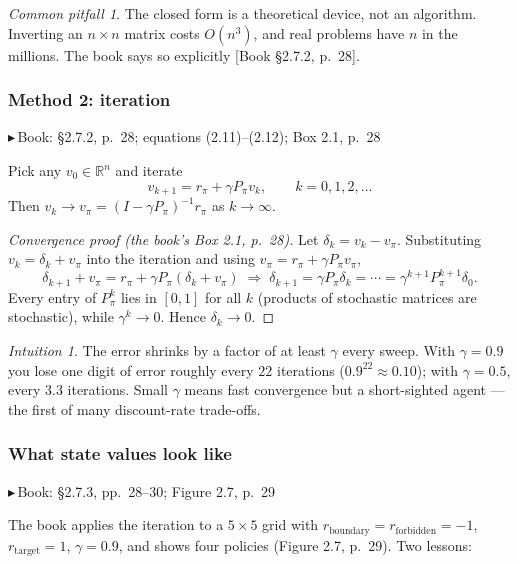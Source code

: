 \documentclass[11pt, letterpaper]{article}
\theoremstyle{runin}
\theoremstyle{runinplain}
\theoremstyle{remark}
\newtheorem*{warning}{Common pitfall}
\newtheorem*{intuition}{Intuition}
\newcommand{\R}{\mathbb{R}}
\newcommand{\bk}[1]{{\color{bookblue}\small$\blacktriangleright$\,\textsf{Book: #1}}}
\newcommand{\bkin}[1]{{\color{bookblue}\small[\textsf{Book #1}]}}
\begin{document}
\begin{warning}
The closed form is a theoretical device, not an algorithm. Inverting an
$n\times n$ matrix costs $O(n^3)$, and real problems have $n$ in the millions.
The book says so explicitly \bkin{\S2.7.2, p.~28}.
\end{warning}

\subsubsection{Method 2: iteration}

\bk{\S2.7.2, p.~28; equations (2.11)--(2.12); Box 2.1, p.~28}

Pick any $v_0\in\R^n$ and iterate
\[
  v_{k+1}=r_\pi+\gamma P_\pi v_k,\qquad k=0,1,2,\dots
\]
Then $v_k\to v_\pi=(I-\gamma P_\pi)^{-1}r_\pi$ as $k\to\infty$.

\begin{proof}[Convergence proof (the book's Box 2.1, p.~28)]
Let $\delta_k=v_k-v_\pi$. Substituting $v_k=\delta_k+v_\pi$ into the iteration and
using $v_\pi=r_\pi+\gamma P_\pi v_\pi$,
\[
  \delta_{k+1}+v_\pi = r_\pi+\gamma P_\pi(\delta_k+v_\pi)
  \;\Longrightarrow\;
  \delta_{k+1}=\gamma P_\pi\delta_k = \cdots = \gamma^{k+1}P_\pi^{k+1}\delta_0 .
\]
Every entry of $P_\pi^k$ lies in $[0,1]$ for all $k$ (products of stochastic
matrices are stochastic), while $\gamma^{k}\to0$. Hence $\delta_k\to0$.
\end{proof}

\begin{intuition}
The error shrinks by a factor of at least $\gamma$ every sweep. With $\gamma=0.9$
you lose one digit of error roughly every $22$ iterations
($0.9^{22}\approx0.10$); with $\gamma=0.5$, every $3.3$ iterations. Small $\gamma$
means fast convergence but a short-sighted agent --- the first of many
discount-rate trade-offs.
\end{intuition}

\subsubsection{What state values look like}

\bk{\S2.7.3, pp.~28--30; Figure 2.7, p.~29}

The book applies the iteration to a $5\times5$ grid with
$r_{\text{boundary}}=r_{\text{forbidden}}=-1$, $r_{\text{target}}=1$, $\gamma=0.9$,
and shows four policies (Figure 2.7, p.~29). Two lessons:
\end{document}
